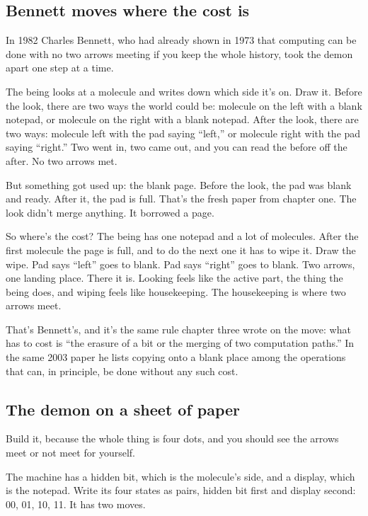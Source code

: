 \documentclass[11pt,twoside]{article}
\theoremstyle{thielethm}
\theoremstyle{thieledef}
\theoremstyle{thieledef}
\theoremstyle{thieledef}
\theoremstyle{thielethm}
\theoremstyle{thieleobs}
\theoremstyle{thielethm}
\begin{document}
\subsection{Bennett moves where the cost is}

In 1982 Charles Bennett, who had already shown in 1973 that computing can be done with no two arrows meeting if you keep the whole history, took the demon apart one step at a time.

The being looks at a molecule and writes down which side it's on. Draw it. Before the look, there are two ways the world could be: molecule on the left with a blank notepad, or molecule on the right with a blank notepad. After the look, there are two ways: molecule left with the pad saying ``left,'' or molecule right with the pad saying ``right.'' Two went in, two came out, and you can read the before off the after. No two arrows met.

But something got used up: the blank page. Before the look, the pad was blank and ready. After it, the pad is full. That's the fresh paper from chapter one. The look didn't merge anything. It borrowed a page.

So where's the cost? The being has one notepad and a lot of molecules. After the first molecule the page is full, and to do the next one it has to wipe it. Draw the wipe. Pad says ``left'' goes to blank. Pad says ``right'' goes to blank. Two arrows, one landing place. There it is. Looking feels like the active part, the thing the being does, and wiping feels like housekeeping. The housekeeping is where two arrows meet.

That's Bennett's, and it's the same rule chapter three wrote on the move: what has to cost is ``the erasure of a bit or the merging of two computation paths.'' In the same 2003 paper he lists copying onto a blank place among the operations that can, in principle, be done without any such cost.

\subsection{The demon on a sheet of paper}

Build it, because the whole thing is four dots, and you should see the arrows meet or not meet for yourself.

The machine has a hidden bit, which is the molecule's side, and a display, which is the notepad. Write its four states as pairs, hidden bit first and display second: 00, 01, 10, 11. It has two moves.
\end{document}
